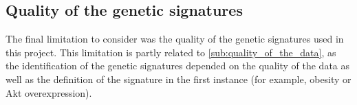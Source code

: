









\subsection{Quality of the genetic signatures}
\label{sub:quality_of_the_genetic_signatures}

The final limitation to consider was the quality of the genetic signatures used in this project.
This limitation is partly related to \cref{sub:quality_of_the_data}, as  the identification of the  genetic signatures depended  on the quality of the data as well as the definition  of the signature in the first instance (for example, obesity or Akt overexpression).

